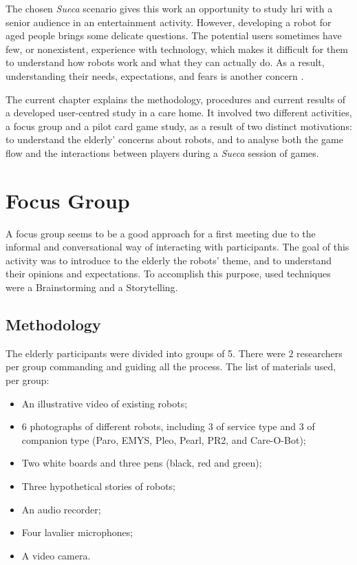 \label{chapter:user-studies}

The chosen \emph{Sueca} scenario gives this work an opportunity to study \ac{hri} with a senior audience in an entertainment activity.
However, developing a robot for aged people brings some delicate questions.
The potential users sometimes have few, or nonexistent, experience with technology, which makes it difficult for them to understand how robots work and what they can actually do.
As a result, understanding their needs, expectations, and fears is another concern \cite{Oliveira}.


The current chapter explains the methodology, procedures and current results of a developed user-centred study in a care home.
It involved two different activities, a focus group and a pilot card game study, as a result of two distinct motivations: to understand the elderly' concerns about robots, and to analyse both the game flow and the interactions between players during a \emph{Sueca} session of games.


\section{Focus Group}

A focus group seems to be a good approach for a first meeting due to the informal and conversational way of interacting with participants.
The goal of this activity was to introduce to the elderly the robots' theme, and to understand their opinions and expectations.
To accomplish this purpose, used techniques were a Brainstorming and a Storytelling.

\subsection{Methodology}
The elderly participants were divided into groups of 5.
There were 2 researchers per group commanding and guiding all the process.
The list of materials used, per group:

\begin{itemize}
\item An illustrative video of existing robots;
\item 6 photographs of different robots, including 3 of service type and 3 of companion type (Paro, EMYS, Pleo, Pearl, PR2, and Care-O-Bot);
\item Two white boards and three pens (black, red and green);
\item Three hypothetical stories of robots;
\item An audio recorder;
\item Four lavalier microphones;
\item A video camera.
\end{itemize}

